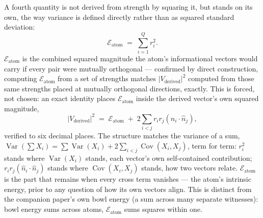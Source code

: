 \documentclass[12pt, a4paper]{article}
\begin{document}
A fourth quantity is not derived from strength by squaring it, but
stands on its own, the way variance is defined directly rather than
as squared standard deviation:
\begin{equation}
    \mathcal{E}_{\text{atom}} \;=\; \sum_{i=1}^Q r_i^2.
    \label{eq:information_energy}
\end{equation}
$\mathcal{E}_{\text{atom}}$ is the combined squared magnitude the
atom's informational vectors would carry if every pair were mutually
orthogonal --- confirmed by direct construction, computing
$\mathcal{E}_{\text{atom}}$ from a set of strengths matches $\lvert
V_{\text{derived}}\rvert^2$ computed from those same strengths placed
at mutually orthogonal directions, exactly. This is forced, not
chosen: an exact identity places $\mathcal{E}_{\text{atom}}$ inside
the derived vector's own squared magnitude,
\[
\lvert V_{\text{derived}}\rvert^2 \;=\; \mathcal{E}_{\text{atom}}
\;+\; 2\sum_{i<j} r_ir_j(\hat n_i\cdot\hat n_j),
\]
verified to six decimal places. The structure matches the variance
of a sum, $\operatorname{Var}(\sum X_i) = \sum\operatorname{Var}(X_i)
+ 2\sum_{i<j}\operatorname{Cov}(X_i,X_j)$, term for term: $r_i^2$
stands where $\operatorname{Var}(X_i)$ stands, each vector's own
self-contained contribution; $r_ir_j(\hat n_i\cdot\hat n_j)$ stands
where $\operatorname{Cov}(X_i,X_j)$ stands, how two vectors relate.
$\mathcal{E}_{\text{atom}}$ is the part that remains when every cross
term vanishes --- the atom's intrinsic energy, prior to any question
of how its own vectors align. This is distinct from the companion
paper's own bowl energy (a sum across many separate witnesses):
bowl energy sums across atoms, $\mathcal{E}_{\text{atom}}$ sums
squares within one.
\end{document}

